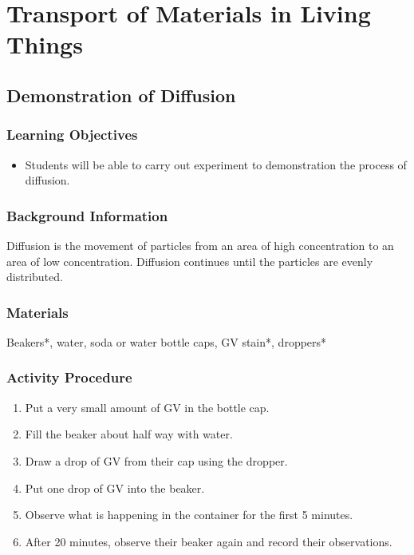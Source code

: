 \section{Transport of Materials in Living Things}

\subsection{Demonstration of Diffusion}

\subsubsection*{Learning Objectives}
\begin{itemize}
\item{Students will be able to carry out experiment to demonstration the process of diffusion.}
\end{itemize}

\subsubsection*{Background Information}
Diffusion is the movement of particles from an area of high concentration to an area of low concentration. Diffusion continues until the particles are evenly distributed.

\subsubsection*{Materials}
Beakers*, water, soda or water bottle caps, GV stain*, droppers*

\subsubsection*{Activity Procedure}
\begin{enumerate}
\item{Put a very small amount of GV in the bottle cap.}
\item{Fill the beaker about half way with water.}
\item{Draw a drop of GV from their cap using the dropper.}
\item{Put one drop of GV into the beaker.}
\item{Observe what is happening in the container for the first 5 minutes.}
\item{After 20 minutes, observe their beaker again and record their observations.}
\end{enumerate}

